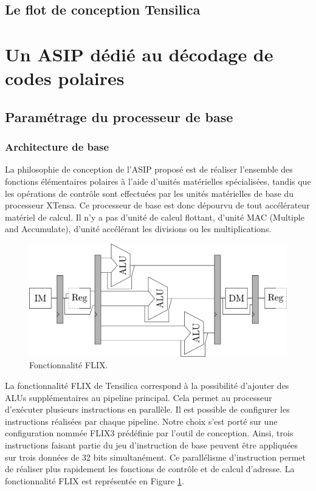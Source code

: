 \subsection{Le flot de conception Tensilica}
\label{tensilica_design}
\section{Un ASIP dédié au décodage de codes polaires}
\label{subsec:sota_sc}
\subsection{Paramétrage du processeur de base}
\subsubsection{Architecture de base}
La philosophie de conception de l'ASIP proposé est de réaliser l'ensemble des fonctions élémentaires polaires à l'aide d'unités matérielles spécialisées, tandis que les opérations de contrôle sont effectuées par les unités matérielles de base du processeur XTensa. Ce processeur de base est donc dépourvu de tout accélérateur matériel de calcul. Il n'y a pas d'unité de calcul flottant, d'unité MAC (Multiple and Accumulate), d'unité accélérant les divisions ou les multiplications.

\begin{figure}
\centering
\includegraphics[width=\textwidth]{main/ch3_fig/flix}
\caption{Fonctionnalité FLIX.}
\label{fig:flix}
\end{figure}

La fonctionnalité FLIX de Tensilica correspond à la possibilité d'ajouter des ALUs supplémentaires au pipeline principal. Cela permet au processeur d'exécuter plusieurs instructions en parallèle. Il est possible de configurer les instructions réalisées par chaque pipeline. Notre choix s'est porté sur une configuration nommée FLIX3 prédéfinie par l'outil de conception. Ainsi, trois instructions faisant partie du jeu d'instruction de base peuvent être appliquées sur trois données de 32 bits simultanément. Ce parallélisme d'instruction permet de réaliser plus rapidement les fonctions de contrôle et de calcul d'adresse. La fonctionnalité FLIX est représentée en Figure \ref{fig:flix}.

